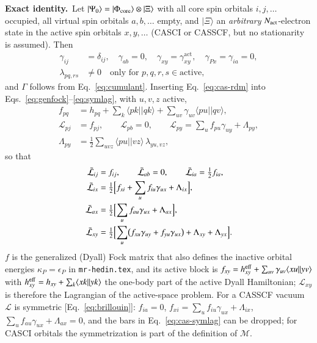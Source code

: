 \documentclass[aip,jcp,reprint,noshowkeys,superscriptaddress]{revtex4-1}
\newcommand{\bcalM}{\boldsymbol{\mathcal M}}
\newcommand{\eps}{\epsilon}
\newcommand{\Lag}{\mathcal{L}}
\newcommand{\sLag}{\bar{\mathcal L}}
\newcommand{\act}{\mathrm{act}}
\newcommand{\Exact}{\textbf{Exact identity.}\ }
\begin{document}
\Exact Let $|\Psi_0\rangle=|\Phi_{\rm core}\rangle\otimes|\Xi\rangle$ with all
core spin orbitals $i,j,\ldots$ occupied, all virtual spin orbitals
$a,b,\ldots$ empty, and $|\Xi\rangle$ an \emph{arbitrary} $N_{\rm act}$-electron
state in the active spin orbitals $x,y,\ldots$ (CASCI or CASSCF, but no
stationarity is assumed).  Then
\begin{align}
  \gamma_{ij}&=\delta_{ij},\quad \gamma_{ab}=0,\quad \gamma_{xy}=\gamma^{\act}_{xy},\quad
  \gamma_{Px}=\gamma_{ia}=0,
  \nonumber\\
  \lambda_{pq,rs}&\ne0\quad\text{only for }p,q,r,s\in\text{active},
  \label{eq:cas-rdm}
\end{align}
and $\Gamma$ follows from Eq.~\eqref{eq:cumulant}.  Inserting
Eq.~\eqref{eq:cas-rdm} into Eqs.~\eqref{eq:genfock}--\eqref{eq:symlag},
with $u,v,z$ active,
\begin{align}
  f_{pq}&=h_{pq}+\sum_{k}\langle pk||qk\rangle+\sum_{uv}\gamma_{uv}\langle pu||qv\rangle ,
  \label{eq:cas-fock}\\
  \Lag_{pj}&=f_{pj},\qquad \Lag_{pb}=0,\qquad
  \Lag_{py}=\sum_{u}f_{pu}\gamma_{uy}+\Lambda_{py},
  \nonumber\\
  \Lambda_{py}&=\frac12\sum_{uvz}\langle pu||vz\rangle\,\lambda_{yu,vz},
  \label{eq:cas-lag}
\end{align}
so that
\begin{align}
  \sLag_{ij}&=f_{ij},\qquad \sLag_{ab}=0,\qquad \sLag_{ia}=\tfrac12 f_{ia},
  \nonumber\\
  \sLag_{ix}&=\tfrac12\Bigl[f_{xi}+\sum_u f_{iu}\gamma_{ux}+\Lambda_{ix}\Bigr],
  \nonumber\\
  \sLag_{ax}&=\tfrac12\Bigl[\sum_u f_{au}\gamma_{ux}+\Lambda_{ax}\Bigr],
  \nonumber\\
  \sLag_{xy}&=\tfrac12\Bigl[\sum_u\bigl(f_{xu}\gamma_{uy}+f_{yu}\gamma_{ux}\bigr)+\Lambda_{xy}+\Lambda_{yx}\Bigr].
  \label{eq:cas-symlag}
\end{align}
$f$ is the generalized (Dyall) Fock matrix that also defines the inactive
orbital energies $\kappa_P=\eps_P$ in \texttt{mr-hedin.tex}, and its active
block is $f_{xy}=h^{\rm eff}_{xy}+\sum_{uv}\gamma_{uv}\langle xu||yv\rangle$ with
$h^{\rm eff}_{xy}=h_{xy}+\sum_k\langle xk||yk\rangle$ the one-body part of the
active Dyall Hamiltonian; $\Lag_{xy}$ is therefore the Lagrangian of the
active-space problem.  For a CASSCF vacuum $\Lag$ is symmetric
[Eq.~\eqref{eq:brillouin}]: $f_{ia}=0$, $f_{xi}=\sum_u f_{iu}\gamma_{ux}+\Lambda_{ix}$,
$\sum_u f_{au}\gamma_{ux}+\Lambda_{ax}=0$, and the bars in
Eq.~\eqref{eq:cas-symlag} can be dropped; for CASCI orbitals the
symmetrization is part of the definition of $\bcalM$.
\end{document}
